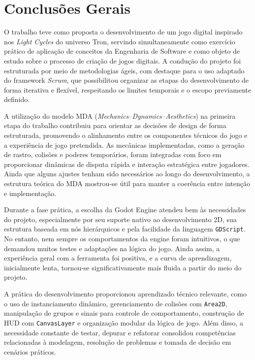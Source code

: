 \chapter[Conclusões Gerais]{Conclusões Gerais}

O trabalho teve como proposta o desenvolvimento de um jogo digital inspirado nos \textit{Light Cycles} do universo Tron, servindo simultaneamente como exercício prático de aplicação de conceitos da Engenharia de Software e como objeto de estudo sobre o processo de criação de jogos digitais. A condução do projeto foi estruturada por meio de metodologias ágeis, com destaque para o uso adaptado do framework \textit{Scrum}, que possibilitou organizar as etapas do desenvolvimento de forma iterativa e flexível, respeitando os limites temporais e o escopo previamente definido.

A utilização do modelo MDA (\textit{Mechanics–Dynamics–Aesthetics}) na primeira etapa do trabalho contribuiu para orientar as decisões de design de forma estruturada, promovendo o alinhamento entre os componentes técnicos do jogo e a experiência de jogo pretendida. As mecânicas implementadas, como a geração de rastro, colisões e poderes temporários, foram integradas com foco em proporcionar dinâmicas de disputa rápida e interação estratégica entre jogadores. Ainda que alguns ajustes tenham sido necessários ao longo do desenvolvimento, a estrutura teórica do MDA mostrou-se útil para manter a coerência entre intenção e implementação.

Durante a fase prática, a escolha da Godot Engine atendeu bem às necessidades do projeto, especialmente por seu suporte nativo ao desenvolvimento 2D, sua estrutura baseada em nós hierárquicos e pela facilidade da linguagem \texttt{GDScript}. No entanto, nem sempre os comportamentos da engine foram intuitivos, o que demandou muitos testes e adaptações na lógica do jogo. Ainda assim, a experiência geral com a ferramenta foi positiva, e a curva de aprendizagem, inicialmente lenta, tornou-se significativamente mais fluida a partir do meio do projeto.

A prática do desenvolvimento proporcionou aprendizado técnico relevante, como o uso de instanciamento dinâmico, gerenciamento de colisões com \texttt{Area2D}, manipulação de grupos e sinais para controle de comportamento, construção de HUD com \texttt{CanvasLayer} e organização modular da lógica de jogo. Além disso, a necessidade constante de testar, depurar e refatorar consolidou competências relacionadas à modelagem, resolução de problemas e tomada de decisão em cenários práticos.

